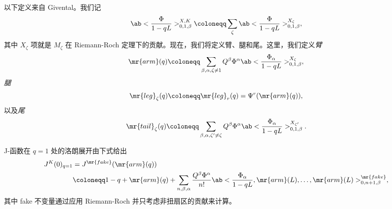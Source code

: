 %
%

以下定义来自 Givental。我们记
\[ \ab<\frac{\Phi}{1-qL}>_{0,1,\beta}^{X,K} \coloneqq \sum_{\zeta} \ab<\frac{\Phi}{1-qL}>_{0,1,\beta}^{X_{\zeta}}, \]
其中 \(X_{\zeta}\) 项就是 \(M_{\zeta}\) 在 Riemann-Roch 定理下的贡献。现在，我们将定义臂、腿和尾。这里，我们定义\textit{臂}
\[ \mr{arm}(q) \coloneqq \sum_{\beta, \alpha, \zeta \neq 1} Q^{\beta} \Phi^{\alpha}\ab<\frac{\Phi_{\alpha}}{1-qL}>_{0,1,\beta}^{X_{\zeta}}, \]
\textit{腿}
\[ \mr{leg}_{\zeta}(q) \coloneqq \mr{leg}_r(q) = \Psi^r (\mr{arm}(q)), \]
以及\textit{尾}
\[ \mr{tail}_{\zeta}(q) \coloneqq \sum_{\beta, \alpha, \zeta' \neq \zeta} Q^{\beta} \Phi^{\alpha} \ab<\frac{\Phi_{\alpha}}{1-qL}>_{0,1,\beta}^{X_{\zeta'}}. \]

\begin{prop}
    J-函数在 \(q = 1\) 处的洛朗展开由下式给出
    \begin{align*}
        J^K(0)_{q=1} &= J^{\mr{fake}}(\mr{arm}(q)) \\
        &\coloneqq 1-q + \mr{arm}(q) + \sum_{n,\beta,\alpha} \frac{Q^{\beta}\Phi^{\alpha}}{n!} \ab<\frac{\Phi_{\alpha}}{1-qL}, \mr{arm}(L), \ldots, \mr{arm}(L)>_{0,n+1,\beta}^{\mr{fake}},
    \end{align*}
    其中 fake 不变量通过应用 Riemann-Roch 并只考虑非扭扇区的贡献来计算。
\end{prop}

